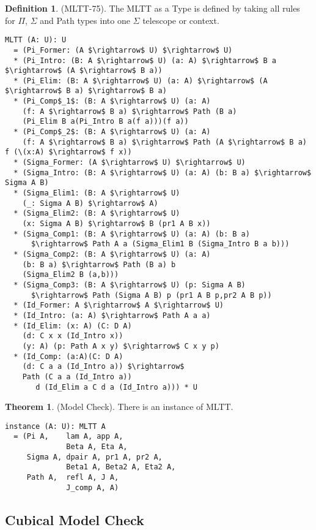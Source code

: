 \documentclass{article}
\theoremstyle{definition}
\newtheorem{theorem}{Theorem}
\newtheorem{definition}{Definition}
\begin{document}
\begin{definition} (MLTT-75).
The MLTT as a Type is defined by taking all rules
for $\Pi$, $\Sigma$ and Path types into one $\Sigma$ telescope or context.
\begin{lstlisting}[mathescape=true]
MLTT (A: U): U
  = (Pi_Former: (A $\rightarrow$ U) $\rightarrow$ U)
  * (Pi_Intro: (B: A $\rightarrow$ U) (a: A) $\rightarrow$ B a $\rightarrow$ (A $\rightarrow$ B a))
  * (Pi_Elim: (B: A $\rightarrow$ U) (a: A) $\rightarrow$ (A $\rightarrow$ B a) $\rightarrow$ B a)
  * (Pi_Comp$_1$: (B: A $\rightarrow$ U) (a: A)
    (f: A $\rightarrow$ B a) $\rightarrow$ Path (B a)
    (Pi_Elim B a(Pi_Intro B a(f a)))(f a))
  * (Pi_Comp$_2$: (B: A $\rightarrow$ U) (a: A)
    (f: A $\rightarrow$ B a) $\rightarrow$ Path (A $\rightarrow$ B a) f (\(x:A) $\rightarrow$ f x))
  * (Sigma_Former: (A $\rightarrow$ U) $\rightarrow$ U)
  * (Sigma_Intro: (B: A $\rightarrow$ U) (a: A) (b: B a) $\rightarrow$ Sigma A B)
  * (Sigma_Elim1: (B: A $\rightarrow$ U)
    (_: Sigma A B) $\rightarrow$ A)
  * (Sigma_Elim2: (B: A $\rightarrow$ U)
    (x: Sigma A B) $\rightarrow$ B (pr1 A B x))
  * (Sigma_Comp1: (B: A $\rightarrow$ U) (a: A) (b: B a) 
      $\rightarrow$ Path A a (Sigma_Elim1 B (Sigma_Intro B a b)))
  * (Sigma_Comp2: (B: A $\rightarrow$ U) (a: A)
    (b: B a) $\rightarrow$ Path (B a) b
    (Sigma_Elim2 B (a,b)))
  * (Sigma_Comp3: (B: A $\rightarrow$ U) (p: Sigma A B)
      $\rightarrow$ Path (Sigma A B) p (pr1 A B p,pr2 A B p))
  * (Id_Former: A $\rightarrow$ A $\rightarrow$ U)
  * (Id_Intro: (a: A) $\rightarrow$ Path A a a)
  * (Id_Elim: (x: A) (C: D A)
    (d: C x x (Id_Intro x))
    (y: A) (p: Path A x y) $\rightarrow$ C x y p)
  * (Id_Comp: (a:A)(C: D A)
    (d: C a a (Id_Intro a)) $\rightarrow$
    Path (C a a (Id_Intro a))
       d (Id_Elim a C d a (Id_Intro a))) * U
\end{lstlisting}
\end{definition}

\newpage
\begin{theorem} (Model Check).
There is an instance of MLTT.
\begin{lstlisting}
instance (A: U): MLTT A
  = (Pi A,    lam A, app A,
              Beta A, Eta A,
     Sigma A, dpair A, pr1 A, pr2 A,
              Beta1 A, Beta2 A, Eta2 A,
     Path A,  refl A, J A,
              J_comp A, A)
\end{lstlisting}
\end{theorem}

\subsection*{Cubical Model Check}
\end{document}
